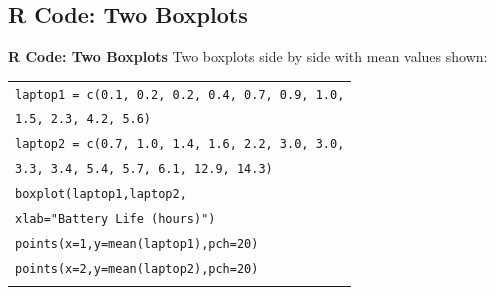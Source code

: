\documentclass[compress]{beamer}        %
\makeatletter
\newcommand{\tcb}{\textcolor{beamer@blendedblue}}
\makeatother
\begin{document}
\subsection{R Code: Two Boxplots}
\begin{frame}{\bf \tcb{R Code: Two Boxplots}}
Two boxplots side by side with mean values shown:\\[0.2cm]
\begin{tabular}{|l|}
\hline
\texttt{laptop1 = c(0.1, 0.2,  0.2, 0.4,  0.7, 0.9,  1.0,}\\
\hspace{2.8cm}\texttt{1.5, 2.3,  4.2, 5.6)}\\
\texttt{laptop2 = c(0.7, 1.0, 1.4, 1.6, 2.2, 3.0, 3.0,}\\
\hspace{2.8cm}\texttt{3.3, 3.4, 5.4, 5.7, 6.1, 12.9, 14.3)}\\[0.2cm]
\texttt{boxplot(laptop1,laptop2,}\\
\hspace{2.8cm}\texttt{xlab="Battery Life (hours)")}\\
\texttt{points(x=1,y=mean(laptop1),pch=20)}\\
\texttt{points(x=2,y=mean(laptop2),pch=20)}\\
\hline
\multicolumn{1}{c}{}\\[-0.1cm]
\end{tabular}

\end{frame}
\end{document}
